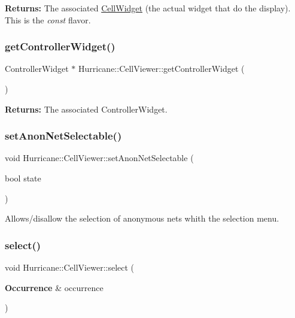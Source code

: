 {\bfseries Returns\+:} The associated \hyperlink{classHurricane_1_1CellWidget}{Cell\+Widget} (the actual widget that do the display). This is the {\itshape const} flavor. \mbox{\label{classHurricane_1_1CellViewer_a153855cfa6baa5d50bf0339820c4f145}} 
\subsubsection{\texorpdfstring{get\+Controller\+Widget()}{getControllerWidget()}}
{\footnotesize\ttfamily Controller\+Widget $\ast$ Hurricane\+::\+Cell\+Viewer\+::get\+Controller\+Widget (\begin{DoxyParamCaption}{ }\end{DoxyParamCaption})\hspace{0.3cm}{\ttfamily [inline]}}

{\bfseries Returns\+:} The associated Controller\+Widget. \mbox{\label{classHurricane_1_1CellViewer_a7e4c9aaf405e4895e1527515dff3f067}} 
\subsubsection{\texorpdfstring{set\+Anon\+Net\+Selectable()}{setAnonNetSelectable()}}
{\footnotesize\ttfamily void Hurricane\+::\+Cell\+Viewer\+::set\+Anon\+Net\+Selectable (\begin{DoxyParamCaption}\item[{bool}]{state }\end{DoxyParamCaption})}

Allows/disallow the selection of anonymous nets whith the selection menu. \mbox{\label{classHurricane_1_1CellViewer_a9f5b6c901e01c53c66cbd0f347cb10be}} 
\subsubsection{\texorpdfstring{select()}{select()}}
{\footnotesize\ttfamily void Hurricane\+::\+Cell\+Viewer\+::select (\begin{DoxyParamCaption}\item[{\textbf{ Occurrence} \&}]{occurrence }\end{DoxyParamCaption})}

